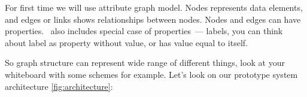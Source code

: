\secdown

For first time we will use attribute graph model. Nodes represents data
elements, and edges or links shows relationships between nodes. Nodes and edges
can have properties. \neo\ also includes special case of properties\ --- labels,
you can think about label as property without value, or has value equal to
itself.

So graph structure can represent wide range of different things, look at your
whiteboard with some schemes for example. Let’s look on our prototype system
architecture \autoref{fig:architecture}:



\secup
